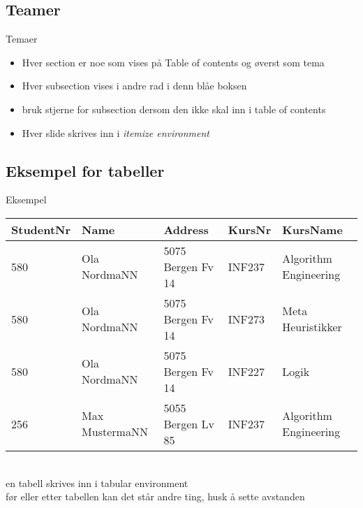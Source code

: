 \subsection*{Teamer}
\begin{frame}{Temaer}
\begin{itemize}
    \item Hver section er noe som vises på Table of contents og øverst som tema
    \item Hver subsection vises i andre rad i denn blåe boksen
    \item bruk stjerne for subsection dersom den ikke skal inn i table of contents
    \item Hver slide skrives inn i \textit{itemize environment}
\end{itemize}
\end{frame}

\subsection*{Eksempel for tabeller}
\begin{frame}{Eksempel}
\begin{tabular}{l|l|l|l|l}
 StudentNr & Name & Address & KursNr & KursName \\\hline
 580 & Ola NordmaNN & 5075 Bergen Fv 14 & INF237 & Algorithm Engineering\\
 580 & Ola NordmaNN & 5075 Bergen Fv 14 & INF273 & Meta Heuristikker\\
 580 & Ola NordmaNN & 5075 Bergen Fv 14 & INF227 & Logik\\
 256 & Max MustermaNN & 5055 Bergen Lv 85 & INF237 & Algorithm Engineering\\
\end{tabular}
\\[5mm] %
en tabell skrives inn i tabular environment\\
før eller etter tabellen kan det står andre ting, husk å sette avstanden
\end{frame}

